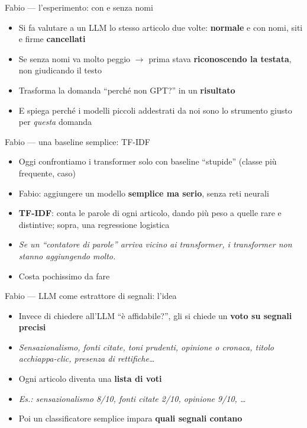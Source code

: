 \documentclass[aspectratio=169]{beamer}
\newcommand{\hl}[1]{\textbf{#1}}
\begin{document}
\begin{frame}{Fabio --- l'esperimento: con e senza nomi}
  \vfill
  \begin{itemize}[<+->]
    \setlength\itemsep{0.8em}
    \item Si fa valutare a un LLM lo stesso articolo due volte: \hl{normale} e con nomi, siti e firme \hl{cancellati}
    \item Se senza nomi va molto peggio $\rightarrow$ prima stava \hl{riconoscendo la testata}, non giudicando il testo
    \item Trasforma la domanda ``perch\'e non GPT?'' in un \hl{risultato}
    \item E spiega perch\'e i modelli piccoli addestrati da noi sono lo strumento giusto per \emph{questa} domanda
  \end{itemize}
  \vfill
\end{frame}

\begin{frame}{Fabio --- una baseline semplice: TF-IDF}
  \vfill
  \begin{itemize}[<+->]
    \setlength\itemsep{0.8em}
    \item Oggi confrontiamo i transformer solo con baseline ``stupide'' (classe pi\`u frequente, caso)
    \item Fabio: aggiungere un modello \hl{semplice ma serio}, senza reti neurali
    \item \hl{TF-IDF}: conta le parole di ogni articolo, dando pi\`u peso a quelle rare e distintive; sopra, una regressione logistica
    \item[] {\small\itshape Se un ``contatore di parole'' arriva vicino ai transformer, i transformer non stanno aggiungendo molto.}
    \item Costa pochissimo da fare
  \end{itemize}
  \vfill
\end{frame}

\begin{frame}{Fabio --- LLM come estrattore di segnali: l'idea}
  \vfill
  \begin{itemize}[<+->]
    \setlength\itemsep{0.8em}
    \item Invece di chiedere all'LLM ``\`e affidabile?'', gli si chiede un \hl{voto su segnali precisi}
    \item[] {\small\itshape Sensazionalismo, fonti citate, toni prudenti, opinione o cronaca, titolo acchiappa-clic, presenza di rettifiche\dots}
    \item Ogni articolo diventa una \hl{lista di voti}
    \item[] {\small\itshape Es.: sensazionalismo 8/10, fonti citate 2/10, opinione 9/10, \dots}
    \item Poi un classificatore semplice impara \hl{quali segnali contano}
  \end{itemize}
  \vfill
\end{frame}
\end{document}
